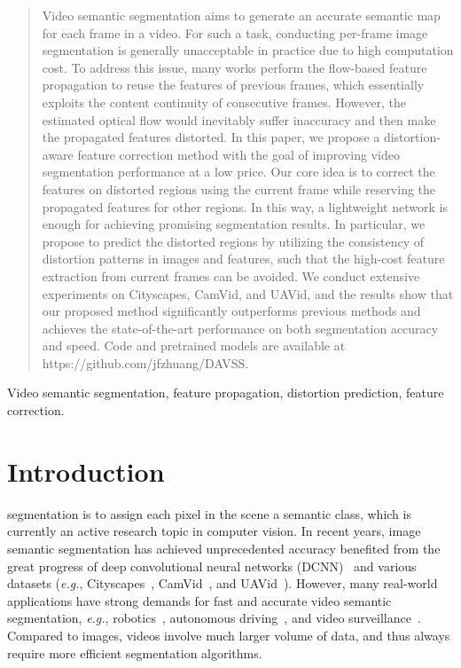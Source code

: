 \documentclass[journal]{IEEEtran}
\begin{document}
\begin{abstract}
	Video semantic segmentation aims to generate an accurate semantic map for each frame in a video. For such a task, conducting per-frame image segmentation is generally unacceptable in practice due to high computation cost. To address this issue, many works perform the flow-based feature propagation to reuse the features of previous frames, which essentially exploits the content continuity of consecutive frames. 
	However, the estimated optical flow would inevitably suffer inaccuracy and then make the propagated features distorted. In this paper, we propose a distortion-aware feature correction method with the goal of improving video segmentation performance at a low price. Our core idea is to correct the features on distorted regions using the current frame while reserving the propagated features for other regions. In this way, a lightweight network is enough for achieving promising segmentation results. In particular, we propose to predict the distorted regions by utilizing the consistency of distortion patterns in images and features, such that the high-cost feature extraction from current frames can be avoided. We conduct extensive experiments on Cityscapes, CamVid, and UAVid, and the results show that our proposed method significantly outperforms previous methods and achieves the state-of-the-art performance on both segmentation accuracy and speed. Code and pretrained models are available at https://github.com/jfzhuang/DAVSS.
\end{abstract}


\begin{IEEEkeywords}
	Video semantic segmentation, feature propagation, distortion prediction, feature correction.
\end{IEEEkeywords}


\IEEEpeerreviewmaketitle


\section{Introduction}
\label{sec:introduction}
 segmentation is to assign each pixel in the scene a semantic class, which is currently an active research topic in computer vision. In recent years, image semantic segmentation has achieved unprecedented accuracy benefited from the great progress of deep convolutional neural networks (DCNN)~\cite{long2015fully} and various datasets (\textit{e.g.}, Cityscapes~\cite{Cordts_2016_CVPR}, CamVid~\cite{brostow2009semantic}, and UAVid~\cite{lyu2020uavid}).
However, many real-world applications have strong demands for fast and accurate video semantic segmentation, \textit{e.g.}, robotics~\cite{kostavelis2015semantic}, autonomous driving~\cite{teichmann2018multinet}, and video surveillance~\cite{Liu_2017_CVPR}.
Compared to images, videos involve much larger volume of data, and thus always require more efficient segmentation algorithms.
\end{document}
